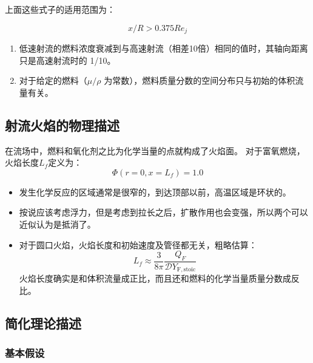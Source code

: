 上面这些式子的适用范围为：

\begin{equation}
    x/R > 0.375 Re_j
\end{equation}

\begin{enumerate}
    \item 低速射流的燃料浓度衰减到与高速射流（相差10倍）相同的值时，其轴向距离只是高速射流时的 1/10。
    \item 对于给定的燃料（\(\mu/\rho\) 为常数），燃料质量分数的空间分布只与初始的体积流量有关。
\end{enumerate}

\subsection{射流火焰的物理描述}
在流场中，燃料和氧化剂之比为化学当量的点就构成了火焰面。
对于富氧燃烧，火焰长度\(L_f\)定义为：
\begin{equation}
    \Phi(r=0, x=L_f) = 1.0
\end{equation}

\begin{itemize}
    \item 发生化学反应的区域通常是很窄的，到达顶部以前，高温区域是环状的。
    \item 按说应该考虑浮力，但是考虑到拉长之后，扩散作用也会变强，所以两个可以近似认为是抵消了。
    \item 对于圆口火焰，火焰长度和初始速度及管径都无关，粗略估算：
    \begin{equation}
        L_f\approx \frac{3}{8\pi}\frac{Q_F}{\mathcal{D}Y_\mathrm{F,stoic}}
    \end{equation}火焰长度确实是和体积流量成正比，而且还和燃料的化学当量质量分数成反比。
\end{itemize}

\subsection{简化理论描述}

\subsubsection{基本假设}

